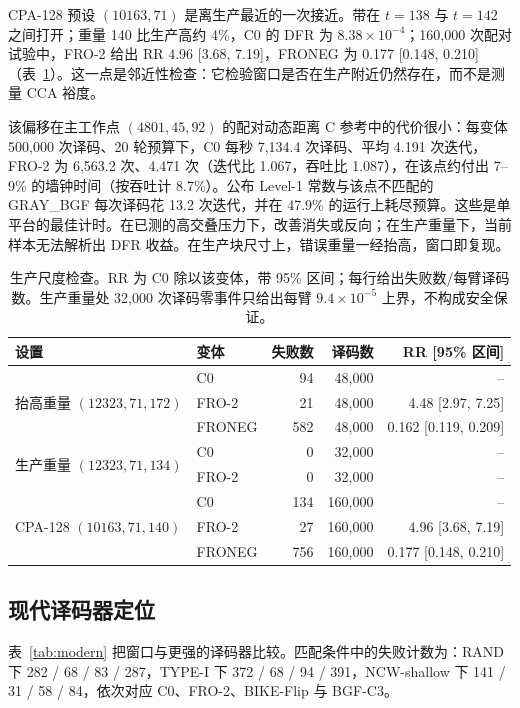 \documentclass[UTF8,a4paper,10pt,twocolumn]{ctexart}
\begin{document}
CPA-128 预设 $(10163,71)$ 是离生产最近的一次接近。带在 $t=138$ 与 $t=142$ 之间打开；重量 140 比生产高约 4\%，C0 的 DFR 为 $8.38\times10^{-4}$；160{,}000 次配对试验中，FRO-2 给出 RR 4.96 [3.68, 7.19]，FRONEG 为 0.177 [0.148, 0.210]（表~\ref{tab:added}）。这一点是邻近性检查：它检验窗口是否在生产附近仍然存在，而不是测量 CCA 裕度。

该偏移在主工作点 $(4801,45,92)$ 的配对动态距离 C 参考中的代价很小：每变体 500{,}000 次译码、20 轮预算下，C0 每秒 7{,}134.4 次译码、平均 4.191 次迭代，FRO-2 为 6{,}563.2 次、4.471 次（迭代比 1.067，吞吐比 1.087），在该点约付出 7--9\% 的墙钟时间（按吞吐计 8.7\%）。公布 Level-1 常数与该点不匹配的 GRAY\_BGF 每次译码花 13.2 次迭代，并在 47.9\% 的运行上耗尽预算。这些是单平台的最佳计时。在已测的高交叠压力下，改善消失或反向；在生产重量下，当前样本无法解析出 DFR 收益。在生产块尺寸上，错误重量一经抬高，窗口即复现。

\begin{table}[!t]
\centering
\small
\caption{生产尺度检查。RR 为 C0 除以该变体，带 95\% 区间；每行给出失败数/每臂译码数。生产重量处 32{,}000 次译码零事件只给出每臂 $9.4\times10^{-5}$ 上界，不构成安全保证。}
\label{tab:added}
\begin{tabular}{llrrr}
\toprule
设置 & 变体 & 失败数 & 译码数 & RR [95\% 区间] \\
\midrule
\multirow{3}{*}{抬高重量 $(12323,71,172)$} & C0 & 94 & 48{,}000 & -- \\
 & FRO-2 & 21 & 48{,}000 & 4.48 [2.97, 7.25] \\
 & FRONEG & 582 & 48{,}000 & 0.162 [0.119, 0.209] \\
\midrule
\multirow{2}{*}{生产重量 $(12323,71,134)$} & C0 & 0 & 32{,}000 & -- \\
 & FRO-2 & 0 & 32{,}000 & -- \\
\midrule
\multirow{3}{*}{CPA-128 $(10163,71,140)$} & C0 & 134 & 160{,}000 & -- \\
 & FRO-2 & 27 & 160{,}000 & 4.96 [3.68, 7.19] \\
 & FRONEG & 756 & 160{,}000 & 0.177 [0.148, 0.210] \\
\bottomrule
\end{tabular}
\end{table}

\subsection{现代译码器定位}\label{sec:modern}

表~\ref{tab:modern} 把窗口与更强的译码器比较。匹配条件中的失败计数为：RAND 下 282 / 68 / 83 / 287，TYPE-I 下 372 / 68 / 94 / 391，NCW-shallow 下 141 / 31 / 58 / 84，依次对应 C0、FRO-2、BIKE-Flip 与 BGF-C3。
\end{document}
